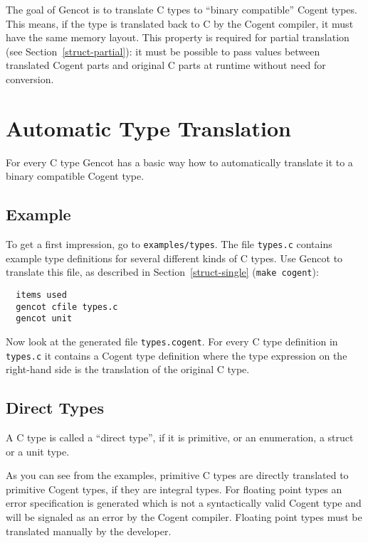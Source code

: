 \documentclass[a4paper]{report}
\newcommand{\code}[1]{\textnormal{\texttt{#1}}}
\begin{document}
The goal of Gencot is to translate C types to ``binary compatible'' Cogent types. This means, if the type is 
translated back to C by the Cogent compiler, it must have the same memory layout. This property is required
for partial translation (see Section~\ref{struct-partial}): it must be possible to pass values between 
translated Cogent parts and original C parts at runtime without need for conversion.

\section{Automatic Type Translation}
\label{types-auto}

For every C type Gencot has a basic way how to automatically translate it to a binary compatible Cogent type. 

\subsection{Example}
\label{types-auto-example}

To get a first impression, go to \code{examples/types}. The file \code{types.c} contains example type definitions
for several different kinds of C types. Use Gencot to translate this file, as described in Section~\ref{struct-single} 
(\code{make cogent}):
\begin{verbatim}
  items used
  gencot cfile types.c
  gencot unit
\end{verbatim}

Now look at the generated file \code{types.cogent}. For every C type definition in \code{types.c} it contains 
a Cogent type definition where the type expression on the right-hand side is the translation of the original C type.

\subsection{Direct Types}
\label{types-auto-direct}

A C type is called a ``direct type'', if it is primitive, or an enumeration, a struct or a unit type.

As you can see from the examples, primitive C types are directly translated to primitive Cogent types, if they are
integral types. For floating point types an error specification is generated which is not a syntactically valid 
Cogent type and will be signaled as an error by the Cogent compiler. Floating point types must be translated manually
by the developer.
\end{document}
